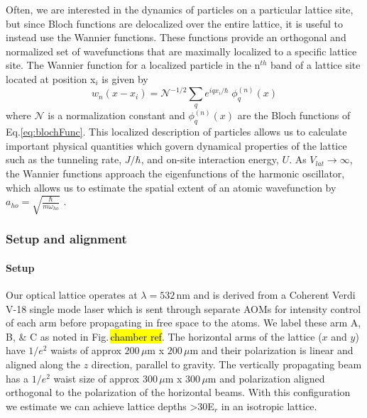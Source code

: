 Often, we are interested in the dynamics of particles on a particular lattice site, but since Bloch functions are delocalized over the entire lattice, it is useful to instead use the Wannier functions. 
These functions provide an orthogonal and normalized set of wavefunctions that are maximally localized to a specific lattice site. 
The Wannier function for a localized particle in the n$^{th}$ band of a lattice site located at position x$_i$ is given by \cite{Jaksch2005}
	\begin{equation} \label{eq:wannier}
		 w_{n}(x - x_i) = \mathcal{N}^{-1/2} \sum_q e^{iqx_i/ \hbar} \; \phi_q^{(n)}(x)
	\end{equation}
where $\mathcal{N}$ is a normalization constant and $\phi_q^{(n)}(x)$ are the Bloch functions of Eq.\;\ref{eq:blochFunc}.
This localized description of particles allows us to calculate important physical quantities which govern dynamical properties of the lattice such as the tunneling rate, $J/ \hbar$, and on-site interaction energy, $U$. 
As $V_{lat}\!\rightarrow\!\infty$, the Wannier functions approach the eigenfunctions of the harmonic oscillator, which allows us to estimate the spatial extent of an atomic wavefunction by $a_{ho} = \sqrt{\frac{\hbar}{m \omega_{ho}}}$ \cite{Jaksch2005}.

\subsubsection{Setup and alignment} \label{sssec:532_align}

\paragraph{Setup}\label{ssec:lattice_setup}

Our optical lattice operates at $\lambda=532\,$nm and is derived from a Coherent Verdi V-18 single mode laser which is sent through separate AOMs for intensity control of each arm before propagating in free space to the atoms. 
We label these arm A, B, \& C as noted in Fig.\,\hl{chamber ref}.
The horizontal arms of the lattice ($x$ and $y$) have $1/e^2$ waists of approx $200\,\mu$m x $200\,\mu$m and their polarization is linear and aligned along the $z$ direction, parallel to gravity. 
The vertically propagating beam has a $1/e^2$ waist size of approx $300\,\mu$m x $300\,\mu$m and polarization aligned orthogonal to the polarization of the horizontal beams. 
With this configuration we estimate we can achieve lattice depths >$30$E$_r$ in an isotropic lattice. 

